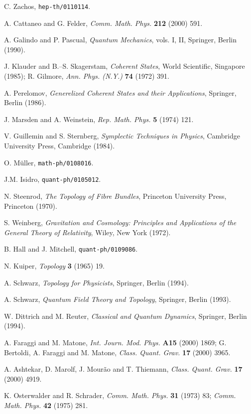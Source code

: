 \documentclass[a4paper,a4paper]{article}
\begin{document}
\begin{thebibliography}{99}
C. Zachos, {\tt hep-th/0110114}.

A. Cattaneo and G. Felder, 
{\it Comm. Math. Phys.} {\bf 212} (2000) 591.

A. Galindo and P. Pascual, {\it Quantum Mechanics}, vols. I, II, Springer, Berlin (1990).

J. Klauder and B.--S. Skagerstam, {\it Coherent States}, World Scientific, Singapore (1985);
R. Gilmore, {\it Ann. Phys. (N.Y.)} {\bf 74} (1972) 391.

A. Perelomov, {\it Generelized Coherent States and their Applications}, Springer, Berlin (1986). 

J. Marsden and A. Weinstein, {\it Rep. Math. Phys.} {\bf 5} (1974) 121.

V. Guillemin and S. Sternberg, {\it Symplectic Techniques in Physics}, 
Cambridge University Press, Cambridge (1984).

O. M\"uller, {\tt math-ph/0108016}.

J.M. Isidro, {\tt quant-ph/0105012}.

N. Steenrod, {\it The Topology of Fibre Bundles}, Princeton University 
Press, Princeton (1970).

S. Weinberg, {\it Gravitation and Cosmology: Principles and Applications of 
the General Theory of Relativity}, Wiley, New York (1972).

B. Hall and J. Mitchell, {\tt quant-ph/0109086}.

N. Kuiper, {\it Topology} {\bf 3} (1965) 19.

A. Schwarz, {\it Topology for Physicists}, Springer, Berlin (1994).

A. Schwarz, {\it Quantum Field Theory and Topology}, Springer, Berlin (1993).

W. Dittrich and M. Reuter, {\it Classical and Quantum Dynamics}, Springer, 
Berlin (1994).

A. Faraggi and M. Matone, {\it Int. Journ. Mod. Phys.} {\bf A15} (2000) 1869;
G. Bertoldi, A. Faraggi and M. Matone, {\it Class. Quant. Grav.} {\bf 17} (2000) 3965.

A. Ashtekar, D. Marolf, J. Mour\~ao and T. Thiemann, {\it Class. Quant. 
Grav.} {\bf 17} (2000) 4919.

K. Osterwalder and R. Schrader, {\it Comm. Math. Phys.} {\bf 31} (1973) 83;
{\it Comm. Math. Phys.} {\bf 42} (1975) 281.


\end{thebibliography}
\end{document}
